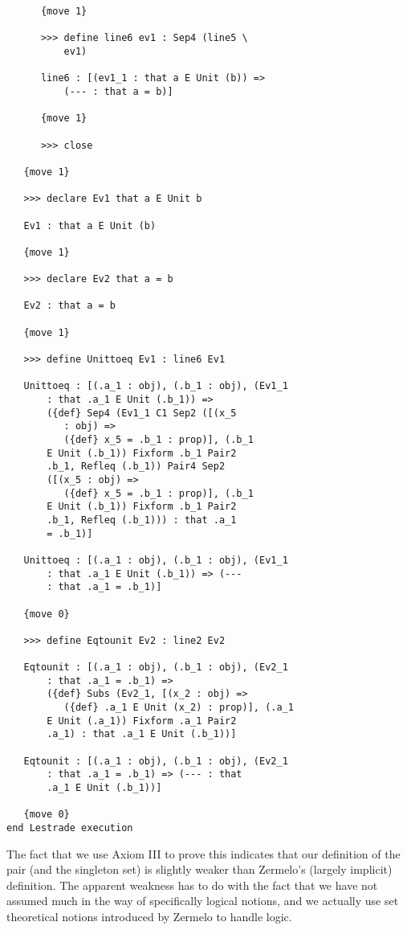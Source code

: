 \documentclass[12pt]{article}
\begin{document}
\begin{enumerate}
\begin{verbatim}
      {move 1}

      >>> define line6 ev1 : Sep4 (line5 \
          ev1)

      line6 : [(ev1_1 : that a E Unit (b)) => 
          (--- : that a = b)]

      {move 1}

      >>> close

   {move 1}

   >>> declare Ev1 that a E Unit b

   Ev1 : that a E Unit (b)

   {move 1}

   >>> declare Ev2 that a = b

   Ev2 : that a = b

   {move 1}

   >>> define Unittoeq Ev1 : line6 Ev1

   Unittoeq : [(.a_1 : obj), (.b_1 : obj), (Ev1_1 
       : that .a_1 E Unit (.b_1)) => 
       ({def} Sep4 (Ev1_1 C1 Sep2 ([(x_5 
          : obj) => 
          ({def} x_5 = .b_1 : prop)], (.b_1 
       E Unit (.b_1)) Fixform .b_1 Pair2 
       .b_1, Refleq (.b_1)) Pair4 Sep2 
       ([(x_5 : obj) => 
          ({def} x_5 = .b_1 : prop)], (.b_1 
       E Unit (.b_1)) Fixform .b_1 Pair2 
       .b_1, Refleq (.b_1))) : that .a_1 
       = .b_1)]

   Unittoeq : [(.a_1 : obj), (.b_1 : obj), (Ev1_1 
       : that .a_1 E Unit (.b_1)) => (--- 
       : that .a_1 = .b_1)]

   {move 0}

   >>> define Eqtounit Ev2 : line2 Ev2

   Eqtounit : [(.a_1 : obj), (.b_1 : obj), (Ev2_1 
       : that .a_1 = .b_1) => 
       ({def} Subs (Ev2_1, [(x_2 : obj) => 
          ({def} .a_1 E Unit (x_2) : prop)], (.a_1 
       E Unit (.a_1)) Fixform .a_1 Pair2 
       .a_1) : that .a_1 E Unit (.b_1))]

   Eqtounit : [(.a_1 : obj), (.b_1 : obj), (Ev2_1 
       : that .a_1 = .b_1) => (--- : that 
       .a_1 E Unit (.b_1))]

   {move 0}
end Lestrade execution

\end{verbatim}

The fact that we use Axiom III to prove this indicates that our definition of the pair (and the singleton set) is slightly weaker than Zermelo's (largely implicit) definition.  The apparent weakness has to do with the fact that we have not assumed much in the way of specifically logical notions, and we actually use set theoretical notions introduced by Zermelo to handle logic.


\end{enumerate}
\end{document}
